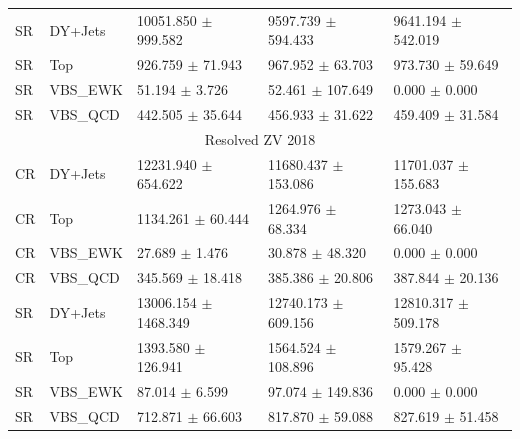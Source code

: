 \begin{table}
{\begin{tabular}{lllll}
      SR     & DY+Jets  & 10051.850 \( \pm \) 999.582  & 9597.739 \( \pm \) 594.433  & 9641.194 \( \pm \) 542.019  \\
      SR     & Top      & 926.759 \( \pm \) 71.943     & 967.952 \( \pm \) 63.703    & 973.730 \( \pm \) 59.649    \\
      SR     & VBS\_EWK & 51.194 \( \pm \) 3.726       & 52.461 \( \pm \) 107.649    & 0.000 \( \pm \) 0.000       \\
      SR     & VBS\_QCD & 442.505 \( \pm \) 35.644     & 456.933 \( \pm \) 31.622    & 459.409 \( \pm \) 31.584    \\
      \midrule
      \multicolumn{5}{c}{Resolved ZV 2018}                                                                         \\
      \midrule
      CR     & DY+Jets  & 12231.940 \( \pm \) 654.622  & 11680.437 \( \pm \) 153.086 & 11701.037 \( \pm \) 155.683 \\
      CR     & Top      & 1134.261 \( \pm \) 60.444    & 1264.976 \( \pm \) 68.334   & 1273.043 \( \pm \) 66.040   \\
      CR     & VBS\_EWK & 27.689 \( \pm \) 1.476       & 30.878 \( \pm \) 48.320     & 0.000 \( \pm \) 0.000       \\
      CR     & VBS\_QCD & 345.569 \( \pm \) 18.418     & 385.386 \( \pm \) 20.806    & 387.844 \( \pm \) 20.136    \\
      SR     & DY+Jets  & 13006.154 \( \pm \) 1468.349 & 12740.173 \( \pm \) 609.156 & 12810.317 \( \pm \) 509.178 \\
      SR     & Top      & 1393.580 \( \pm \) 126.941   & 1564.524 \( \pm \) 108.896  & 1579.267 \( \pm \) 95.428   \\
      SR     & VBS\_EWK & 87.014 \( \pm \) 6.599       & 97.074 \( \pm \) 149.836    & 0.000 \( \pm \) 0.000       \\
      SR     & VBS\_QCD & 712.871 \( \pm \) 66.603     & 817.870 \( \pm \) 59.088    & 827.619 \( \pm \) 51.458    \\
      \bottomrule
    \end{tabular}}\label{tab:fit-values-zjj}
\end{table}